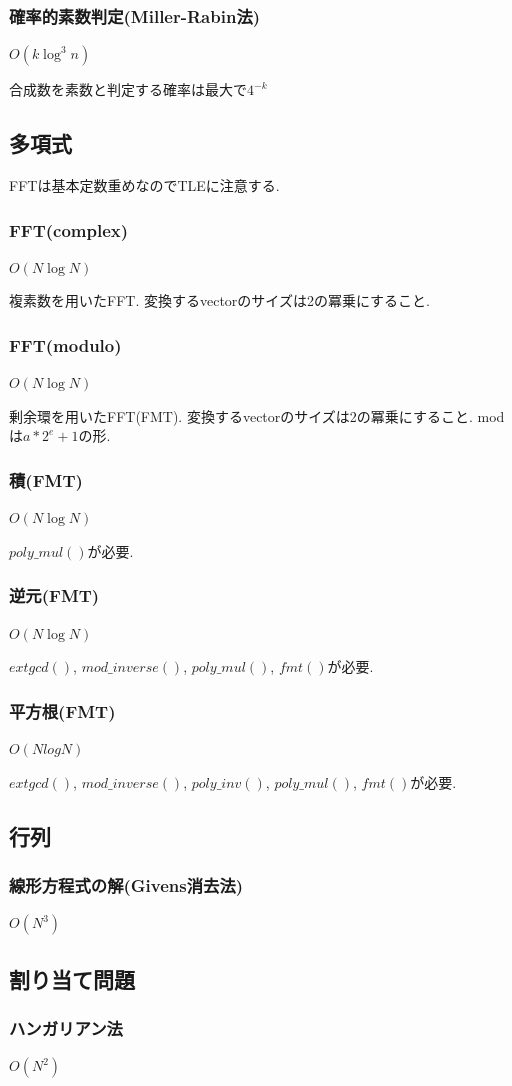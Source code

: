 \subsubsection{確率的素数判定(Miller-Rabin法)}
$O(k\log^3n)$\par
合成数を素数と判定する確率は最大で$4^{-k}$\\


\subsection{多項式}
FFTは基本定数重めなのでTLEに注意する.
\subsubsection{FFT(complex)}
$O(N \log N)$\par
複素数を用いたFFT. 変換するvectorのサイズは2の冪乗にすること.


\subsubsection{FFT(modulo)}
$O(N \log N)$\par
剰余環を用いたFFT(FMT). 変換するvectorのサイズは2の冪乗にすること. modは$a*2^e+1$の形.\\


\subsubsection{積(FMT)}
$O(N \log N)$\par
$poly\_mul()$が必要.


\subsubsection{逆元(FMT)}
$O(N \log N)$\par
$extgcd()$, $mod\_inverse()$, $poly\_mul()$, $fmt()$が必要.


\subsubsection{平方根(FMT)}
$O(N log N)$\par
$extgcd()$, $mod\_inverse()$, $poly\_inv()$, $poly\_mul()$, $fmt()$が必要.



\subsection{行列}


\subsubsection{線形方程式の解(Givens消去法)}
$O(N^3)$


\subsection{割り当て問題}
\subsubsection{ハンガリアン法}
$O(N^2)$

